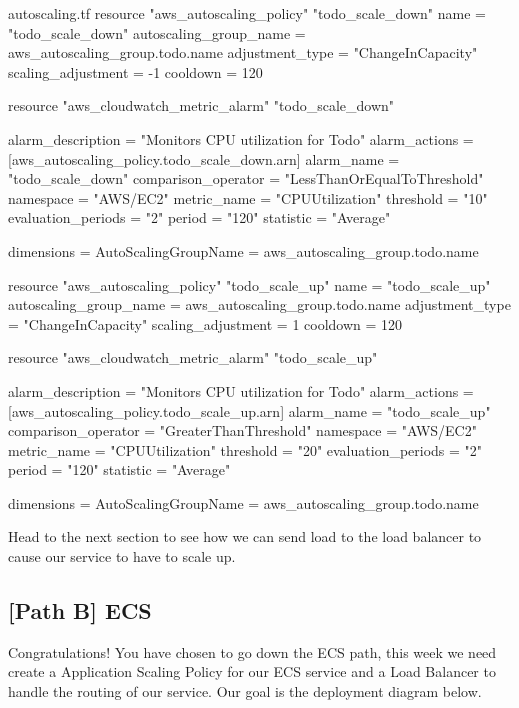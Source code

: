 \documentclass{csse4400}
\begin{document}
\begin{code}[language=terraform,numbers=none,keepspaces=true]{autoscaling.tf}
resource "aws_autoscaling_policy" "todo_scale_down" {
  name                   = "todo_scale_down"
  autoscaling_group_name = aws_autoscaling_group.todo.name
  adjustment_type        = "ChangeInCapacity"
  scaling_adjustment     = -1
  cooldown               = 120
}

resource "aws_cloudwatch_metric_alarm" "todo_scale_down" {
  alarm_description   = "Monitors CPU utilization for Todo"
  alarm_actions       = [aws_autoscaling_policy.todo_scale_down.arn]
  alarm_name          = "todo_scale_down"
  comparison_operator = "LessThanOrEqualToThreshold"
  namespace           = "AWS/EC2"
  metric_name         = "CPUUtilization"
  threshold           = "10"
  evaluation_periods  = "2"
  period              = "120"
  statistic           = "Average"

  dimensions          = {
    AutoScalingGroupName = aws_autoscaling_group.todo.name
  }
}

resource "aws_autoscaling_policy" "todo_scale_up" {
  name                   = "todo_scale_up"
  autoscaling_group_name = aws_autoscaling_group.todo.name
  adjustment_type        = "ChangeInCapacity"
  scaling_adjustment     = 1
  cooldown               = 120
}

resource "aws_cloudwatch_metric_alarm" "todo_scale_up" {
  alarm_description   = "Monitors CPU utilization for Todo"
  alarm_actions       = [aws_autoscaling_policy.todo_scale_up.arn]
  alarm_name          = "todo_scale_up"
  comparison_operator = "GreaterThanThreshold"
  namespace           = "AWS/EC2"
  metric_name         = "CPUUtilization"
  threshold           = "20"
  evaluation_periods  = "2"
  period              = "120"
  statistic           = "Average"

  dimensions          = {
    AutoScalingGroupName = aws_autoscaling_group.todo.name
  }
}
\end{code}

Head to the next section to see how we can send load to the load balancer to cause our service to have to scale up.
\subsection{[Path B] ECS}

Congratulations! You have chosen to go down the ECS path, this week we need create a Application Scaling Policy for our ECS service and a Load Balancer to handle the routing of our service. Our goal is the deployment diagram below.
\end{document}
